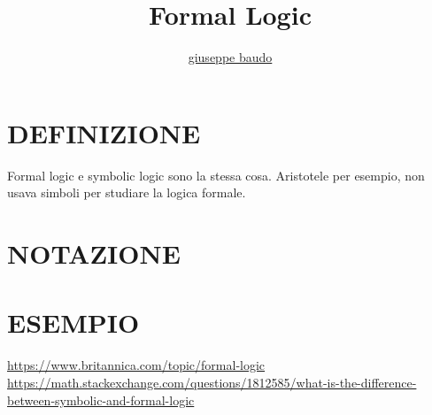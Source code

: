 \documentclass[a4paper,10pt]{article}
\title{Formal Logic}
\author{\href{http://www.baudo.hol.es}{giuseppe baudo}}
\begin{document}
\maketitle

\section{DEFINIZIONE}
Formal logic e symbolic logic sono la stessa cosa. Aristotele per esempio, non usava simboli per studiare la logica formale.

\section{NOTAZIONE}

\section{ESEMPIO}

\begin{thebibliography}{100}
   \url{https://www.britannica.com/topic/formal-logic}
   \url{https://math.stackexchange.com/questions/1812585/what-is-the-difference-between-symbolic-and-formal-logic}
\end{thebibliography}
\end{document}

